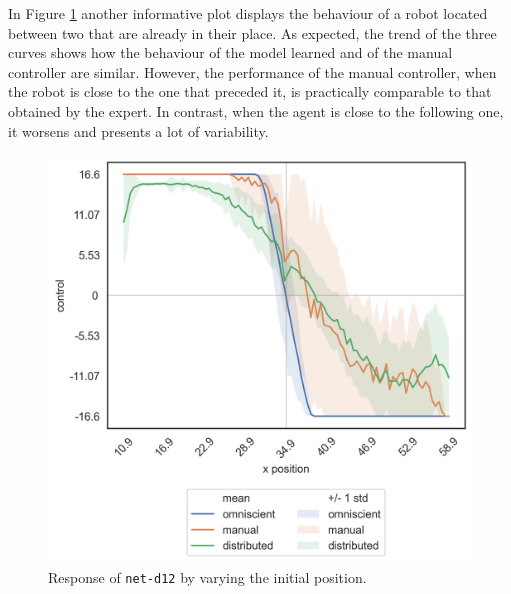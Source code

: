 In Figure \ref{fig:net-d12responseposition} another informative plot displays 
the behaviour of a robot located between two that are already in their place.
As expected, the trend of the three curves shows how the behaviour of the 
model learned and of the manual controller are similar.
However, the performance of the manual controller, when the robot is close to 
the one that preceded it, is practically comparable to that obtained by the 
expert. In contrast, when the agent is close to the following one, it worsens and 
presents a lot of variability.
\begin{figure}[!htb]
	\centering
	\includegraphics[width=.45\textwidth]{contents/images/net-d12/response-varying_init_position-distributed}%
	\caption{Response of \texttt{net-d12} by varying the initial position.}
	\label{fig:net-d12responseposition}
\end{figure}

